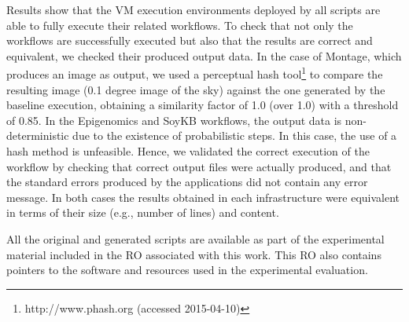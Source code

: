 Results show that the VM execution environments deployed by all scripts are able to
fully execute their related workflows. To check that not only the workflows are successfully executed but also 
that the results are correct and equivalent, we checked their produced output data. In the 
case of Montage, which produces an image as output, we used a perceptual hash tool\footnote{http://www.phash.org (accessed 2015-04-10)}
to compare the resulting image (0.1 degree image of the sky) against the one generated 
by the baseline execution, obtaining a similarity factor of 1.0 (over 1.0) with a threshold of 
0.85. In the Epigenomics and SoyKB workflows, the output data is non-deterministic due to
the existence of probabilistic steps. In this case, the use of a hash method is unfeasible. 
Hence, we validated the correct execution of the workflow by checking that correct output 
files were actually produced, and that the standard errors produced by the applications did not contain any error message.
In both cases the results obtained in each infrastructure were equivalent in terms of their size (e.g., number of lines) 
and content.

All the original and generated scripts are available as part of the experimental material 
included in the RO associated with this 
work. This RO also contains pointers to the software and resources 
used in the experimental evaluation.


